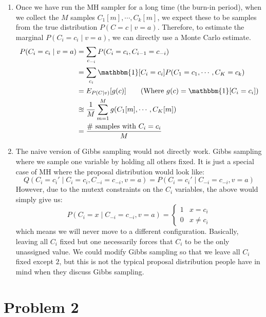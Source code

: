 \documentclass[12pt]{article}
\begin{document}
\begin{enumerate}[label=(\alph*)]
  \item Once we have run the MH sampler for a long time (the burn-in period), when we collect the $M$ samples $C_1[m], \cdots, C_k[m]$, we expect these to be samples from the true distribution $P(C = c \mid v = a)$. Therefore, to estimate the marginal $P(C_i = c_i \mid v = a)$, we can directly use a Monte Carlo estimate.
  \begin{align*}
  	P(C_i = c_i \mid v = a) &= \sum_{c_{-i}} P(C_i = c_i, C_{i-1} = c_{-i}) \\
  	&= \sum_{c_i} \mathbbm{1}[C_i = c_i]P(C_1 = c_1, \cdots, C_K = c_k) \\
  	&= E_{P(C \mid v)}[g(c)] \tag{Where $g(c) = \mathbbm{1}[C_i = c_i]$}\\
  	&\approxeq \frac{1}{M} \sum_{m = 1}^M g(C_1[m], \cdots, C_K[m]) \\
  	&= \frac{\#\text{ samples with }C_i = c_i}{M}
  \end{align*}
  \item The naive version of Gibbs sampling would not directly work. Gibbs sampling where we sample one variable by holding all others fixed. It is just a special case of MH where the proposal distribution would look like: 
  $$
  	Q(C_i = c_i' \mid C_{i} = c_i, C_{-i} = c_{-i}, v= a) = P(C_i = c_i' \mid C_{-i} = c_{-i} ,v=a)
  $$
  However, due to the mutext constraints on the $C_i$ variables, the above would simply give us:
  $$
  P(C_i = x \mid C_{-i} = c_{-i} ,v=a) = \begin{cases} 
      1 & x = c_i \\
      0 & x \neq c_i 
   \end{cases}
	$$
	which means we will never move to a different configuration. Basically, leaving all $C_i$ fixed but one necessarily forces that $C_i$ to be the only unassigned value. We could modify Gibbs sampling so that we leave all $C_i$ fixed except $2$, but this is not the typical proposal distribution people have in mind when they discuss Gibbs sampling.
\end{enumerate}

\pagebreak
\section*{Problem 2}
\end{document}
